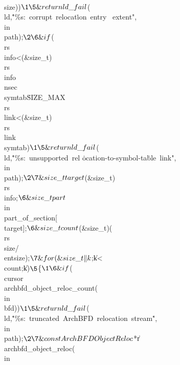 \\{size})){}$\1\5
\&{return} \\{ld\_fail}${}(\\{ld},\.{"\%s:\ corrupt\ relocat}\)\.{ion\ entry%
\ extent"},\\{in}\MG\\{path});{}$\2\6
\&{if} ${}(\\{rs}\MG\\{info}<\V(\&{size\_t})\,\\{rs}\MG\\{info}\G\\{nsec}%
\V\\{symtab}\E\.{SIZE\_MAX}\V\\{rs}\MG\\{link}<\V(\&{size\_t})\,\\{rs}\MG%
\\{link}\I\\{symtab}){}$\1\5
\&{return} \\{ld\_fail}${}(\\{ld},\.{"\%s:\ unsupported\ rel}\)%
\.{ocation-to-symbol-ta}\)\.{ble\ link"},\\{in}\MG\\{path});{}$\2\7
\&{size\_t} \\{target}${}\K(\&{size\_t})\,\\{rs}\MG\\{info};{}$\6
\&{size\_t} \\{part}${}\K\\{in}\MG\\{part\_of\_section}[\\{target}];{}$\6
\&{size\_t} \\{count}${}\K(\&{size\_t})(\\{rs}\MG\\{size}/\\{entsize});{}$\7
\&{for} (\&{size\_t} \|k${}\K{};{}$ ${}\|k<\\{count};{}$ ${}\PP\|k){}$\5
${}\{{}$\1\6
\&{if} ${}(\\{cursor}\G\\{archbfd\_object\_reloc\_count}(\\{in}\MG\\{bfd})){}$%
\1\5
\&{return} \\{ld\_fail}${}(\\{ld},\.{"\%s:\ truncated\ ArchB}\)\.{FD\
relocation\ stream}\)\.{"},\\{in}\MG\\{path});{}$\2\7
\&{const} \\{ArchBFDObjectReloc}${}{*}\|r\K\\{archbfd\_object\_reloc}(\\{in}\MG%
